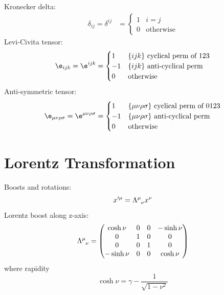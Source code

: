 \documentclass[a4paper, 11pt, normalem]{report}
\begin{document}
Kronecker delta:
\begin{align}
    \delta_{ij} = \delta^{ij} &= \begin{cases} 1 & i=j \\ 0 & \text{otherwise} \end{cases}
\end{align}
Levi-Civita tensor:
\begin{equation}
    \e_{ijk} = \e^{ijk} = \begin{cases} 1 & \{ijk\} \text{ cyclical perm of 123} \\ -1 & \{ijk\} \text{ anti-cyclical perm} \\ 0 & \text{otherwise} \end{cases}
\end{equation}
Anti-symmetric tensor:
\begin{equation}
    \e_{\mu\nu\rho\sigma} = \e^{\mu\nu\rho\sigma} = \begin{cases} 1 & \{\mu\nu\rho\sigma\} \text{ cyclical perm of 0123} \\ -1 & \{\mu\nu\rho\sigma\} \text{ anti-cyclical perm} \\ 0 & \text{otherwise} \end{cases}
\end{equation}

\section{Lorentz Transformation}
Boosts and rotations:
\begin{equation}
    x'^\mu = \tensor{\Lambda}{^\mu_\nu} x^\nu
\end{equation}
Lorentz boost along z-axis:
\begin{equation}
    \tensor{\Lambda}{^\mu_\nu} = \begin{pmatrix} \cosh\nu & 0 & 0 & -\sinh\nu \\ 0 & 1 & 0 & 0 \\ 0 & 0 & 1 & 0 \\ -\sinh\nu & 0 & 0 & \cosh\nu \end{pmatrix}
\end{equation}
where rapidity
\begin{equation}
    \cosh\nu = \gamma - \frac{1}{\sqrt{1-\nu^2}}
\end{equation}
\end{document}
